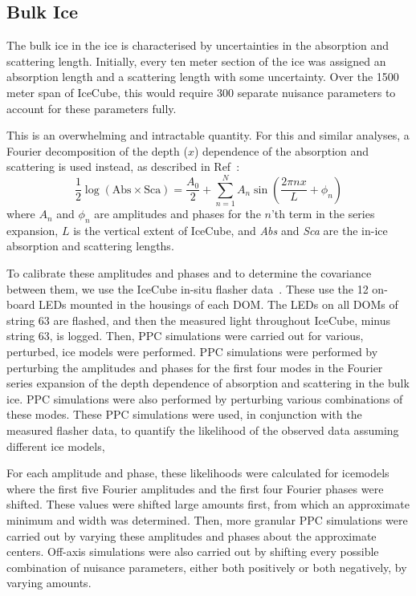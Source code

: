 \documentclass[main.tex]{subfiles}
\begin{document}
\subsection{Bulk Ice}\label{sec:bulk}

The bulk ice in the ice is characterised by uncertainties in the absorption and scattering length. 
Initially, every ten meter section of the ice was assigned an absorption length and a scattering length with some uncertainty. 
Over the 1500 meter span of IceCube, this would require 300 separate nuisance parameters to account for these parameters fully.

This is an overwhelming and intractable quantity. 
For this and similar analyses, a Fourier decomposition of the depth ($x$) dependence of the absorption and scattering is used instead, as described in Ref~\cite{Aartsen_2019_snow}: 
\begin{equation}
    \dfrac{1}{2}\log\left(\text{Abs} \times \text{Sca}\right) = \dfrac{A_{0}}{2} +\sum\limits_{n=1}^{N}A_{n} \sin\left(\dfrac{2\pi nx}{L} + \phi_{n}\right)
\end{equation}
where $A_{n}$ and $\phi_{n}$ are amplitudes and phases for the $n$'th term in the series expansion, $L$ is the vertical extent of IceCube, and \textit{Abs} and \textit{Sca} are the in-ice absorption and scattering lengths. 


To calibrate these amplitudes and phases and to determine the covariance between them, we use the IceCube in-situ flasher data~\cite{Aartsen_2013}. 
These use the 12 on-board LEDs mounted in the housings of each DOM. 
The LEDs on all DOMs of string 63 are flashed, and then the measured light throughout IceCube, minus string 63, is logged. 
Then, PPC simulations were carried out for various, perturbed, ice models were performed. 
PPC simulations were performed by perturbing the amplitudes and phases for the first four modes in the Fourier series expansion of the depth dependence of absorption and scattering in the bulk ice.
PPC simulations were also performed by perturbing various combinations of these modes. 
These PPC simulations were used, in conjunction with the measured flasher data, to quantify the likelihood of the observed data assuming different ice models,

For each amplitude and phase, these likelihoods were calculated for icemodels where the first five Fourier amplitudes and the first four Fourier phases were shifted. 
These values were shifted large amounts first, from which an approximate minimum and width was determined. 
Then, more granular PPC simulations were carried out by varying these amplitudes and phases about the approximate centers. 
Off-axis simulations were also carried out by shifting every possible combination of nuisance parameters, either both positively or both negatively, by varying amounts. 
\end{document}
